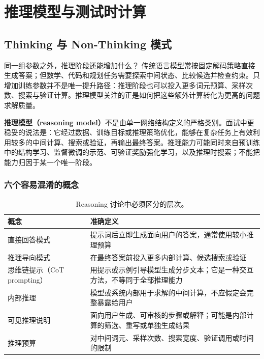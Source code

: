 \part{推理模型与测试时计算}

\chapter{Thinking 与 Non-Thinking 模式}
\label{sec:reasoning-models}

\begin{motivationbox}{同一组参数之外，推理阶段还能增加什么？}
传统语言模型常按固定解码策略直接生成答案；但数学、代码和规划任务需要探索中间状态、比较候选并检查约束。只增加训练参数并不是唯一提升路径：推理阶段也可以投入更多词元预算、采样次数、搜索与验证计算。推理模型关注的正是如何把这些额外计算转化为更高的问题求解质量。
\end{motivationbox}

\textbf{推理模型（reasoning model）}不是由单一网络结构定义的严格类别。面试中更稳妥的说法是：它经过数据、训练目标或推理策略优化，能够在复杂任务上有效利用较多的中间计算、搜索或验证，再输出最终答案。推理能力可能同时来自预训练中的结构学习、监督微调的示范、可验证奖励强化学习，以及推理时搜索；不能把能力归因于某一个唯一阶段。

\figReasoningModes

\section{六个容易混淆的概念}

\begin{table}[htbp]
\centering
\small
\begin{tabularx}{0.96\textwidth}{lY}
\toprule
概念 & 准确定义\\
\midrule
直接回答模式 & 提示词后立即生成面向用户的答案，通常使用较小推理预算\\
推理导向模式 & 在最终答案前投入更多内部计算、候选搜索或验证\\
思维链提示（CoT prompting） & 用提示或示例引导模型生成分步文本；它是一种交互方法，不等同于全部推理能力\\
内部推理 & 模型或系统内部用于求解的中间计算，不应假定会完整暴露给用户\\
可见推理说明 & 面向用户生成、可审核的步骤或解释；可能是内部计算的筛选、重写或单独生成结果\\
推理预算 & 对中间词元、采样次数、搜索宽度、验证调用或时间的限制\\
\bottomrule
\end{tabularx}
\caption{Reasoning 讨论中必须区分的层次。}
\end{table}

